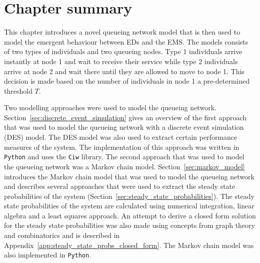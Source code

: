 


\section{Chapter summary}

This chapter introduces a novel queueing network model that is then used to
model the emergent behaviour between EDs and the EMS.
The models consists of two types of individuals and two queueing nodes.
Type 1 individuals arrive instantly at node 1 and wait to receive their
service while type 2 individuals arrive at node 2 and wait there until they
are allowed to move to node 1.
This decision is made based on the number of individuals in node 1 a
pre-determined threshold \(T\).

Two modelling approaches were used to model the queueing network.
Section~\ref{sec:discrete_event_simulation} gives an overview of the first
approach that was used to model the queueing network with a discrete event
simulation (DES) model.
The DES model was also used to extract certain performance measures of the
system.
The implementation of this approach was written in \texttt{Python} and uses the
\texttt{Ciw} library.
The second approach that was used to model the queueing network
was a Markov chain model.
Section~\ref{sec:markov_model} introduces the Markov chain model that was
used to model the queueing network and describes several approaches that
were used to extract the steady state probabilities of the system
(Section~\ref{sec:steady_state_probabilities}).
The steady state probabilities of the system are calculated using numerical
integration, linear algebra and a least squares approach.
An attempt to derive a closed form solution for the steady state
probabilities was also made using concepts from graph theory and
combinatorics and is described in
Appendix~\ref{app:steady_state_probs_closed_form}.
The Markov chain model was also implemented in \texttt{Python}.

